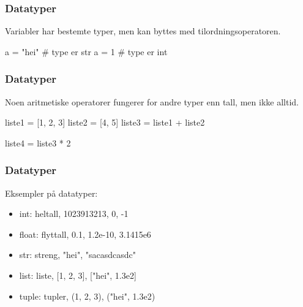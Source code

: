 
\begin{frame}[fragile]
    \frametitle{Datatyper}

    Variabler har bestemte typer, men kan byttes med tilordningsoperatoren. 

\begin{python}
a = "hei" # type er str
a = 1 # type er int
\end{python}

\end{frame}

\begin{frame}[fragile]
    \frametitle{Datatyper}

    Noen aritmetiske operatorer fungerer for andre typer enn tall, men ikke alltid. 

\begin{python}
liste1 = [1, 2, 3]
liste2 = [4, 5]
liste3 = liste1 + liste2

liste4 = liste3 * 2
\end{python}

\end{frame}


\begin{frame}[fragile]
    \frametitle{Datatyper}

    Eksempler på datatyper: 

    \begin{itemize}
        \item int: heltall, 1023913213, 0, -1
        \item float: flyttall, 0.1, 1.2e-10, 3.1415e6
        \item str: streng, "hei", "sacasdcasdc"
        \item list: liste, [1, 2, 3], ["hei", 1.3e2]
        \item tuple: tupler, (1, 2, 3), ("hei", 1.3e2)
    \end{itemize}

\end{frame}

